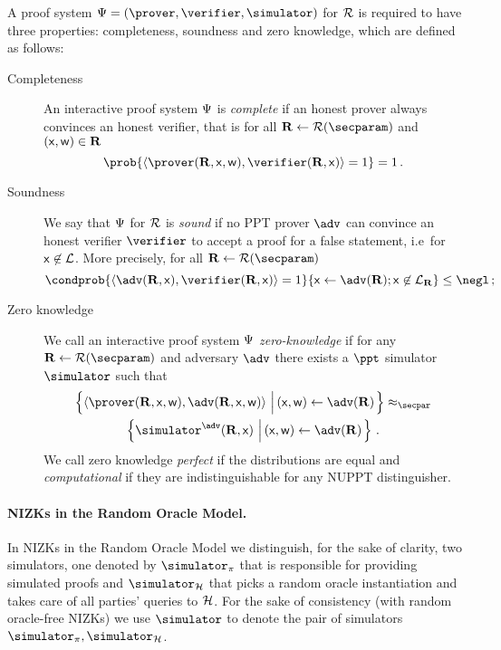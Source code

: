 \documentclass[runningheads,11pt]{llncs}
\theoremstyle{definition}
\begin{document}
A proof system $\proofsystem = (\prover, \verifier, \simulator)$ for $\mathcal{R}$ is required to have three properties: completeness, soundness and zero knowledge, which are defined as follows:
\begin{description}
	\item[Completeness] An interactive proof system $\mathrm{\Psi}$ is \emph{complete} if an honest prover always convinces an honest verifier, that is for all $\REL \gets \RELGEN(\secparam)$ and $(\mathsf{x}, \mathsf{w}) \in \mathbf{R}$
	\[
		\prob{\ip{\prover (\REL, \inp, \wit)}{\verifier (\REL, \inp)} = 1} = 1\,.
	\]
	\item[Soundness] We say that $\mathrm{\Psi}$ for $\mathcal{R}$ is \emph{sound} if no PPT prover $\adv$ can convince an honest verifier $\verifier$ to accept a proof for a false statement, i.e~for $\mathsf{x} \not\in\mathcal{L}$. More precisely, for all $\REL \gets \RELGEN(\secparam)$
	\[
		\condprob{\ip{\adv(\REL, \inp)}{\verifier(\REL, \inp)} = 1}{\inp \gets \adv(\REL); \inp \not\in \LANG_\REL} \leq \negl\,;
	\]
	\item[Zero knowledge] We call an interactive proof system $\mathrm{\Psi}$ \emph{zero-knowledge} if for any $\REL \gets \RELGEN(\secparam)$ and adversary $\adv$ there exists a $\ppt$ simulator $\simulator$ such that
	\begin{multline*}
	  \left\{\ip{\prover(\REL, \inp, \wit)}{\adv(\REL, \inp, \wit)} \,\left|\, (\inp, \wit) \gets \adv(\REL)\vphantom{\simulator^\adv}\right.\right\} \approx_\secpar
		\\
		\left\{\simulator^{\adv}(\REL, \inp)\,\left|\, (\inp, \wit) \gets \adv(\REL)\vphantom{\simulator^\adv}\right.\right\}\,.
	\end{multline*}
	We call zero knowledge \emph{perfect} if the distributions are equal and \emph{computational} if they are indistinguishable for any NUPPT distinguisher.
\end{description}

\paragraph{NIZKs in the Random Oracle Model.}
In NIZKs in the Random Oracle Model we distinguish, for the sake of clarity, two simulators, one denoted by $\simulator_\zkproof$ that is responsible for providing simulated proofs and $\simulator_\ro$ that picks a random oracle instantiation and takes care of all parties' queries to $\mathcal{H}$.
For the sake of consistency (with random oracle-free NIZKs) we use $\simulator$ to denote the pair of simulators $\simulator_\zkproof, \simulator_\ro$.
\end{document}
